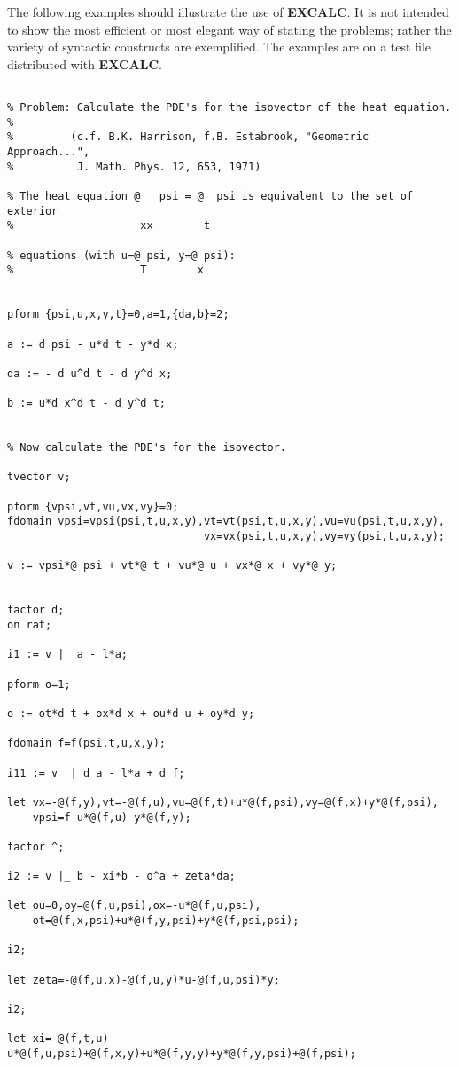 The following examples should illustrate the use of {\bf EXCALC}. It is not
intended to show the most efficient or most elegant way of stating the
problems; rather the variety of syntactic constructs are exemplified.
The examples are on a test file distributed with {\bf EXCALC}.
{\small
\begin{verbatim}

% Problem: Calculate the PDE's for the isovector of the heat equation.
% --------
%         (c.f. B.K. Harrison, f.B. Estabrook, "Geometric Approach...",
%          J. Math. Phys. 12, 653, 1971)

% The heat equation @   psi = @  psi is equivalent to the set of exterior
%                    xx        t

% equations (with u=@ psi, y=@ psi):
%                    T        x


pform {psi,u,x,y,t}=0,a=1,{da,b}=2;

a := d psi - u*d t - y*d x;

da := - d u^d t - d y^d x;

b := u*d x^d t - d y^d t;


% Now calculate the PDE's for the isovector.

tvector v;

pform {vpsi,vt,vu,vx,vy}=0;
fdomain vpsi=vpsi(psi,t,u,x,y),vt=vt(psi,t,u,x,y),vu=vu(psi,t,u,x,y),
                               vx=vx(psi,t,u,x,y),vy=vy(psi,t,u,x,y);

v := vpsi*@ psi + vt*@ t + vu*@ u + vx*@ x + vy*@ y;


factor d;
on rat;

i1 := v |_ a - l*a;

pform o=1;

o := ot*d t + ox*d x + ou*d u + oy*d y;

fdomain f=f(psi,t,u,x,y);

i11 := v _| d a - l*a + d f;

let vx=-@(f,y),vt=-@(f,u),vu=@(f,t)+u*@(f,psi),vy=@(f,x)+y*@(f,psi),
    vpsi=f-u*@(f,u)-y*@(f,y);

factor ^;

i2 := v |_ b - xi*b - o^a + zeta*da;

let ou=0,oy=@(f,u,psi),ox=-u*@(f,u,psi),
    ot=@(f,x,psi)+u*@(f,y,psi)+y*@(f,psi,psi);

i2;

let zeta=-@(f,u,x)-@(f,u,y)*u-@(f,u,psi)*y;

i2;

let xi=-@(f,t,u)-u*@(f,u,psi)+@(f,x,y)+u*@(f,y,y)+y*@(f,y,psi)+@(f,psi);


\end{verbatim}}
